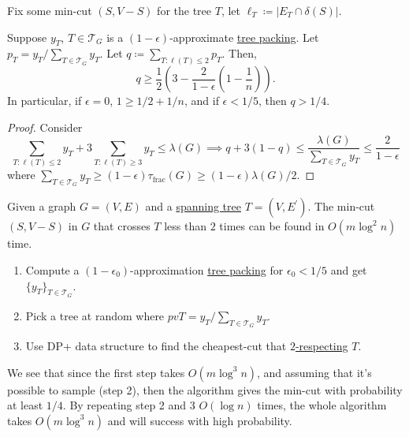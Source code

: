 \begin{notation}
	Fix some min-cut \((S, V-S)\) for the tree \(T\), let \(\ell _T \coloneqq \lvert E_T \cap \delta (S) \rvert \).
\end{notation}

\begin{lemma}\label{lma:}
	Suppose \(y_T\), \(T \in \mathcal{T} _G\) is a \((1 - \epsilon )\)-approximate \hyperref[prb:TP]{tree packing}. Let \(p_T = y_T / \sum_{T\in \mathcal{T} _G} y_T \).  Let \(q \coloneqq \sum_{T \colon \ell (T) \leq 2} p_T \). Then,
	\[
		q \geq \frac{1}{2} \left( 3 - \frac{2}{1 - \epsilon } \left( 1 - \frac{1}{n} \right) \right) .
	\]
	In particular, if \(\epsilon = 0\), \(1 \geq 1 / 2 + 1 / n\), and if \(\epsilon < 1 / 5\), then \(q > 1 / 4\).
\end{lemma}
\begin{proof}
	Consider
	\[
		\sum_{T \colon \ell (T) \leq 2} y_T + 3 \sum_{T \colon \ell (T) \geq 3} y_T
		\leq \lambda (G)
		\implies q + 3 (1 - q)
		\leq \frac{\lambda (G)}{\sum_{T \in \mathcal{T} _G} y_T}
		\leq \frac{2}{1 - \epsilon }
	\]
	where \(\sum_{T \in \mathcal{T} _G} y_T \geq (1 - \epsilon ) \tau _{\text{frac} }(G) \geq (1 - \epsilon ) \lambda (G) / 2 \).
\end{proof}

\begin{theorem}
	Given a graph \(G = (V, E)\) and a \hyperref[def:spanning-tree]{spanning tree} \(T = (V, E^{\prime} )\). The min-cut \((S, V - S)\) in \(G\) that crosses \(T\) less than \(2\) times can be found in \(O(m \log ^2 n)\) time.
\end{theorem}

\begin{enumerate}
	\item Compute a \((1 - \epsilon _0)\)-approximation \hyperref[prb:TP]{tree packing} for \(\epsilon _0 < 1 / 5\) and get \(\{ y_T \} _{T \in \mathcal{T} _G}\).
	\item Pick a tree at random where \(pvT = y_T / \sum_{T \in \mathcal{T} _G} y_T \).
	\item Use DP+ data structure to find the cheapest-cut that \hyperref[def:respecting]{\(2\)-respecting} \(T\).
\end{enumerate}

We see that since the first step takes \(O(m \log ^3 n)\), and assuming that it's possible to sample (step 2), then the algorithm gives the min-cut with probability at least \(1 / 4\). By repeating step 2 and 3 \(O(\log n)\) times, the whole algorithm takes \(O(m \log ^3 n)\) and will success with high probability.

